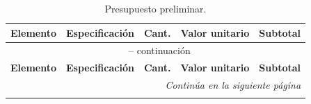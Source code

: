 
\begin{longtable}{@{}p{4.6cm}p{6cm}crr@{}}
\caption{Presupuesto preliminar.}
\label{tab:presupuesto_preliminar} \\
\toprule
\textbf{Elemento} & \textbf{Especificación} & \textbf{Cant.} & \textbf{Valor unitario} & \textbf{Subtotal} \\
\midrule
\endfirsthead
 
\multicolumn{5}{c}{\tablename\ \thetable{} -- continuación} \\
\toprule
\textbf{Elemento} & \textbf{Especificación} & \textbf{Cant.} & \textbf{Valor unitario} & \textbf{Subtotal} \\
\midrule
\endhead
 
\midrule
\multicolumn{5}{r}{\textit{Continúa en la siguiente página}} \\
\endfoot
 
\bottomrule
\endlastfoot
 

\end{longtable}

